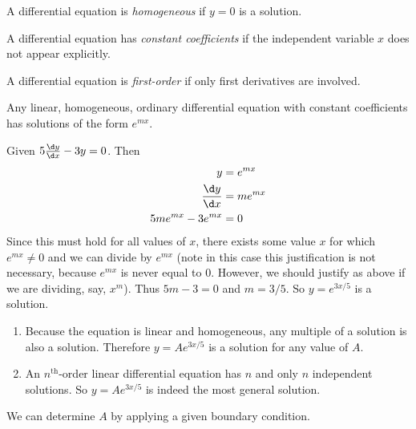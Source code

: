 \documentclass[a4paper]{article}
\begin{document}
\begin{defi}
  A differential equation is \emph{homogeneous} if $y=0$ is a solution.
\end{defi}

\begin{defi}
  A differential equation has \emph{constant coefficients} if the independent variable $x$ does not appear explicitly.
\end{defi}

\begin{defi}
  A differential equation is \emph{first-order} if only first derivatives are involved.
\end{defi}

\begin{thm}
  Any linear, homogeneous, ordinary differential equation with constant coefficients has solutions of the form $e^{mx}$.
\end{thm}
\begin{eg}
  Given $5\frac{\d y}{\d x} - 3y = 0$. Then 
  \begin{align*}
    y &= e^{mx}\\
    \frac{\d y}{\d x} &= me^{mx}\\
    5me^{mx} - 3e^{mx} &= 0
  \end{align*}
  Since this must hold for all values of $x$, there exists some value $x$ for which $e^{mx} \not= 0$ and we can divide by $e^{mx}$ (note in this case this justification is not necessary, because $e^{mx}$ is never equal to 0. However, we should justify as above if we are dividing, say, $x^m$). Thus $5m - 3 = 0$ and $m = 3/5$. So $y = e^{3x/5}$ is a solution. 
\end{eg}

\begin{enumerate}
\item Because the equation is linear and homogeneous, any multiple of a solution is also a solution. Therefore $y = Ae^{3x/5}$ is a solution for any value of $A$. 
\item An $n^\text{th}$-order linear differential equation has $n$ and only $n$ independent solutions. So $y = Ae^{3x/5}$ is indeed the most general solution.
\end{enumerate}
We can determine $A$ by applying a given boundary condition.
\end{document}
